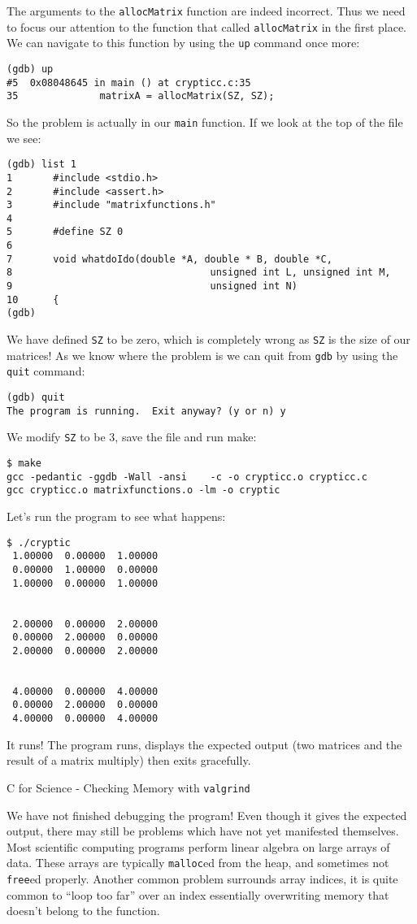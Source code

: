 \documentclass[a4paper,12pt]{article}
\begin{document}
The arguments to the \verb|allocMatrix| function are indeed incorrect. Thus we need to focus our attention to the function that called \verb|allocMatrix| in the first place. We can navigate to this function by using the {\tt up} command once more:
\begin{verbatim}
(gdb) up
#5  0x08048645 in main () at crypticc.c:35
35              matrixA = allocMatrix(SZ, SZ);
\end{verbatim}
So the problem is actually in our {\tt main} function. If we look at the top of the file we see:
\begin{verbatim}
(gdb) list 1
1       #include <stdio.h>
2       #include <assert.h>
3       #include "matrixfunctions.h"
4
5       #define SZ 0
6
7       void whatdoIdo(double *A, double * B, double *C,
8                                  unsigned int L, unsigned int M,
9                                  unsigned int N)
10      {
(gdb) 
\end{verbatim}
We have defined {\tt SZ} to be zero, which is completely wrong as {\tt SZ} is the size of our matrices! As we know where the problem is we can quit from {\tt gdb} by using the {\tt quit} command:
\begin{verbatim}
(gdb) quit
The program is running.  Exit anyway? (y or n) y
\end{verbatim}
We modify {\tt SZ} to be 3, save the file and run make:
\begin{verbatim}
$ make
gcc -pedantic -ggdb -Wall -ansi    -c -o crypticc.o crypticc.c
gcc crypticc.o matrixfunctions.o -lm -o cryptic
\end{verbatim}
Let's run the program to see what happens:
\begin{verbatim}
$ ./cryptic 
 1.00000  0.00000  1.00000 
 0.00000  1.00000  0.00000 
 1.00000  0.00000  1.00000 


 2.00000  0.00000  2.00000 
 0.00000  2.00000  0.00000 
 2.00000  0.00000  2.00000 


 4.00000  0.00000  4.00000 
 0.00000  2.00000  0.00000 
 4.00000  0.00000  4.00000
\end{verbatim}
It runs! The program runs, displays the expected output (two matrices and the result of a matrix multiply) then exits gracefully.\newpage
\begin{center}
\large C for Science - Checking Memory with {\tt valgrind}
\end{center}
We have not finished debugging the program! Even though it gives the expected output, there may still be problems which have not yet manifested themselves. Most scientific computing programs perform linear algebra on large arrays of data. These arrays are typically {\tt malloc}ed from the heap, and sometimes not {\tt free}ed properly. Another common problem surrounds array indices, it is quite common to ``loop too far'' over an index essentially overwriting memory that doesn't belong to the function.
\end{document}
